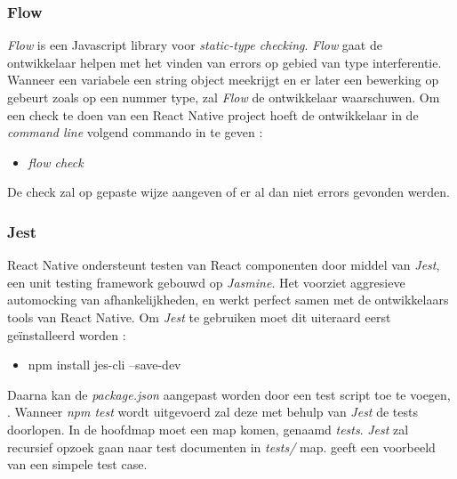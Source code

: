 \subsubsection{Flow}
\emph{Flow} is een Javascript library voor \emph{static-type checking}. \emph{Flow} gaat de ontwikkelaar helpen met het vinden van errors op gebied van type interferentie. Wanneer een variabele een string object meekrijgt en er later een bewerking op gebeurt zoals op een nummer type, zal \emph{Flow} de ontwikkelaar waarschuwen. Om een check te doen van een React Native project hoeft de ontwikkelaar in de \emph{command line} volgend commando in te geven : 
\begin{itemize}
	\item [] \emph{flow check}
\end{itemize}  
De check zal op gepaste wijze aangeven of er al dan niet errors gevonden werden.

\subsubsection{Jest}
React Native ondersteunt testen van React componenten door middel van \emph{Jest}, een unit testing framework gebouwd op \emph{Jasmine}. Het voorziet aggresieve automocking van afhankelijkheden, en werkt perfect samen met de ontwikkelaars tools van React Native. Om \emph{Jest} te gebruiken moet dit uiteraard eerst geïnstalleerd worden :
\begin{itemize}
	\item [] npm install jes-cli --save-dev
\end{itemize}
Daarna kan de \emph{package.json} aangepast worden door een test script toe te voegen, . Wanneer \emph{npm test} wordt uitgevoerd zal deze met behulp van \emph{Jest} de tests doorlopen. In de hoofdmap moet een map komen, genaamd \emph{tests}. \emph{Jest} zal recursief opzoek gaan naar test documenten in \emph{tests/} map.  geeft een voorbeeld van een simpele test case. 


